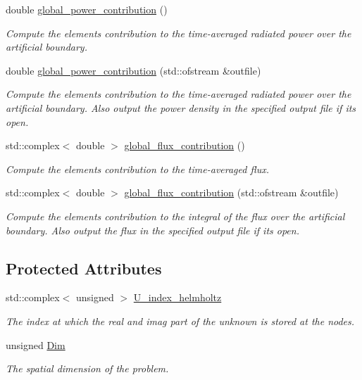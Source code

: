 \begin{DoxyCompactItemize}
double \hyperlink{classoomph_1_1PMLHelmholtzPowerElement_a7641df9f59097452dfac823d2384c290}{global\+\_\+power\+\_\+contribution} ()
\begin{DoxyCompactList}\small\item\em Compute the element\textquotesingle{}s contribution to the time-\/averaged radiated power over the artificial boundary. \end{DoxyCompactList}\item 
double \hyperlink{classoomph_1_1PMLHelmholtzPowerElement_a2576f9adb9c0570b973084e68a8df857}{global\+\_\+power\+\_\+contribution} (std\+::ofstream \&outfile)
\begin{DoxyCompactList}\small\item\em Compute the element\textquotesingle{}s contribution to the time-\/averaged radiated power over the artificial boundary. Also output the power density in the specified output file if it\textquotesingle{}s open. \end{DoxyCompactList}\item 
std\+::complex$<$ double $>$ \hyperlink{classoomph_1_1PMLHelmholtzPowerElement_a528c42eae40b3526363ccf5eb0d20918}{global\+\_\+flux\+\_\+contribution} ()
\begin{DoxyCompactList}\small\item\em Compute the element\textquotesingle{}s contribution to the time-\/averaged flux. \end{DoxyCompactList}\item 
std\+::complex$<$ double $>$ \hyperlink{classoomph_1_1PMLHelmholtzPowerElement_aeea5a41b8fc51cfe1ee1e49a84cbf66b}{global\+\_\+flux\+\_\+contribution} (std\+::ofstream \&outfile)
\begin{DoxyCompactList}\small\item\em Compute the element\textquotesingle{}s contribution to the integral of the flux over the artificial boundary. Also output the flux in the specified output file if it\textquotesingle{}s open. \end{DoxyCompactList}\end{DoxyCompactItemize}
\subsection*{Protected Attributes}
\begin{DoxyCompactItemize}
\item 
std\+::complex$<$ unsigned $>$ \hyperlink{classoomph_1_1PMLHelmholtzPowerElement_a3da25319b6d812c1c626dc9e52ae9e2c}{U\+\_\+index\+\_\+helmholtz}
\begin{DoxyCompactList}\small\item\em The index at which the real and imag part of the unknown is stored at the nodes. \end{DoxyCompactList}\item 
unsigned \hyperlink{classoomph_1_1PMLHelmholtzPowerElement_a8372306b2f6fbcbbd1dc74784056a943}{Dim}
\begin{DoxyCompactList}\small\item\em The spatial dimension of the problem. \end{DoxyCompactList}\end{DoxyCompactItemize}
